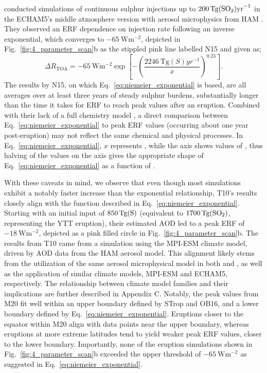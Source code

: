 \documentclass[draft]{agujournal2019}
\begin{document}
   conducted simulations of continuous sulphur injections up to
  \(\SI{200}{\tera\gram(\ce{SO2})\mathrm{yr}^{-1}}\) in the ECHAM5's middle atmosphere
  version \cite{giorgetta2006} with aerosol microphysics from HAM \cite{stier2005}. They
  observed an ERF dependence on  injection rate following an inverse
  exponential, which converges to \(\SI{-65}{\watt\meter^{-2}}\), depicted in
  Fig.~\ref{fig:4_parameter_scan}b as the stippled pink line labelled N15 and given as;
  \begin{equation}
    \Delta R_{\mathrm{TOA}} = -\SI{65}{\watt\metre^{-2}}
    \exp\left[-{\left(\frac{\SI{2246}{\tera\gram(S)yr^{-1}}}{x}\right)}^{0.23}\right].
    \label{eq:niemeier_exponential}
  \end{equation}
  The results by N15, on which Eq.~\ref{eq:niemeier_exponential} is based, are all
  averages over at least three years of steady sulphur burdens, substantially longer
  than the time it takes for ERF to reach peak values after an eruption. Combined with
  their lack of a full chemistry model \cite{niemeier2015}, a direct comparison between
  Eq.~\ref{eq:niemeier_exponential} to peak ERF values (occurring about one year
  post-eruption) may not reflect the same chemical and physical processes. In
  Eq.~\ref{eq:niemeier_exponential}, \(x\) represents , while the axis shows
  values of , thus halving of the  values on the axis gives the
  appropriate shape of Eq.~\ref{eq:niemeier_exponential} as a function of .

  With these caveats in mind, we observe that even though most simulations exhibit a
  notably faster increase than the exponential relationship, T10's results closely align
  with the function described in Eq.~\ref{eq:niemeier_exponential}. Starting with an
  initial input of \(\SI{850}{\tera\gram(\ce{S})}\) (equivalent to
  \(\SI{1700}{\tera\gram(\ce{SO2})}\), representing the YTT eruption), their estimated
  AOD led to a peak ERF of \(\SI{-18}{\watt\meter^{-2}}\), depicted as a pink filled
  circle in Fig.~\ref{fig:4_parameter_scan}b. The results from T10 came from a
  simulation using the MPI-ESM climate model, driven by AOD data from the HAM aerosol
  model. This alignment likely stems from the utilization of the same aerosol
  microphysical model in both  and , as well as
  the application of similar climate models, MPI-ESM and ECHAM5, respectively. The
  relationship between climate model families and their implications are further
  described in Appendix C. Notably, the peak values from M20 fit well within an upper
  boundary defined by STrop and OB16, and a lower boundary defined by
  Eq.~\ref{eq:niemeier_exponential}. Eruptions closer to the equator within M20 align
  with data points near the upper boundary, whereas eruptions at more extreme latitudes
  tend to yield weaker peak ERF values, closer to the lower boundary. Importantly, none
  of the eruption simulations shown in Fig.~\ref{fig:4_parameter_scan}b exceeded the
  upper threshold of \(\SI{-65}{\watt\meter^{-2}}\) as suggested in
  Eq.~\ref{eq:niemeier_exponential}.
\end{document}
